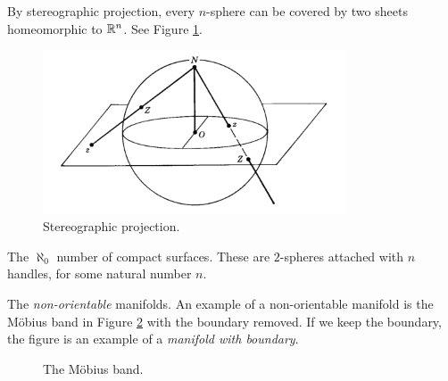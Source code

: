 \documentclass[11pt, english]{article}
\newcommand{\strip}[1]{%
\shadedraw[very thick,top color=white,bottom color=gray,rotate=#1]
 (0:2.8453) ++ (-30:1.5359) arc (60:0:2)
 -- ++  (90:5) arc (0:60:2) -- ++ (150:3) arc (60:120:2)
 -- ++ (210:5) arc (120:60:2) -- cycle;}
\newcommand{\MoebiusStrip}[3]{%
\begin{scope} [transform shape]
    \strip{0}
    \strip{120}
    \strip{-120}
    \draw (-60:3.5) node[scale=6,rotate=30] {#1};
    \draw (180:3.5) node[scale=4,rotate=-90]{#3};
    \clip (-1.4,2.4)--(-.3,6.1)--(1.3,6.1)--(5.3,3.7)--(5.3,-2.7)--cycle;
    \strip{0}
    \draw (60:3.5) node [gray,xscale=-4,yscale=4,rotate=30]{#2};
\end{scope}}
\begin{document}
\begin{example}
By stereographic projection, every $n$-sphere can be covered by two sheets homeomorphic to $\mathbb{R}^n$. See Figure \ref{stereographic}.
\begin{figure}[th]
\centering
\includegraphics[width=90mm]{stereographic.jpg}
\caption{Stereographic projection.}
\label{stereographic}
\end{figure}
\end{example}

\begin{example}
The $\aleph_0$ number of compact surfaces. These are $2$-spheres attached with $n$ handles, for some natural number $n$.
\end{example}

\begin{example}
The \emph{non-orientable} manifolds. An example of a non-orientable manifold is the Möbius band in Figure \ref{mobius} with the boundary removed. If we keep the boundary, the figure is an example of a \emph{manifold with boundary}.

\begin{figure}[h]
\begin{center}
\end{center}
\caption{The Möbius band.}
\label{mobius}
\end{figure}

\end{example}
\end{document}

